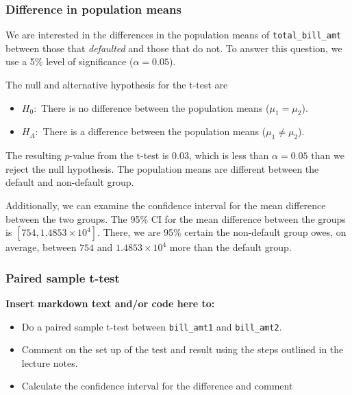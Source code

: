 \documentclass[
]{article}
\providecommand{\tightlist}{%
  \setlength{\itemsep}{0pt}\setlength{\parskip}{0pt}}
\begin{document}
\hypertarget{difference-in-population-means}{%
\subsubsection{Difference in population
means}\label{difference-in-population-means}}

We are interested in the differences in the population means of
\texttt{total\_bill\_amt} between those that \emph{defaulted} and those
that do not. To answer this question, we use a 5\% level of significance
(\(\alpha = 0.05\)).

The null and alternative hypothesis for the t-test are

\begin{itemize}
\tightlist
\item
  \(H_0:\) There is no difference between the population means
  (\(\mu_1 = \mu_2\)).
\item
  \(H_A:\) There is a difference between the population means
  (\(\mu_1 \ne \mu_2\)).
\end{itemize}

The resulting \(p\)-value from the t-test is \(0.03\), which is less
than \(\alpha = 0.05\) than we reject the null hypothesis. The
population means are different between the default and non-default
group.

Additionally, we can examine the confidence interval for the mean
difference between the two groups. The 95\% CI for the mean difference
between the groups is \([754, \ensuremath{1.4853\times 10^{4}}]\).
There, we are 95\% certain the non-default group owes, on average,
between \(754\) and \(\ensuremath{1.4853\times 10^{4}}\) more than the
default group.

\hypertarget{paired-sample-t-test}{%
\subsubsection{Paired sample t-test}\label{paired-sample-t-test}}

\textbf{Insert markdown text and/or code here to:}

\begin{itemize}
\tightlist
\item
  Do a paired sample t-test between \texttt{bill\_amt1} and
  \texttt{bill\_amt2}.
\item
  Comment on the set up of the test and result using the steps outlined
  in the lecture notes.
\item
  Calculate the confidence interval for the difference and comment
\end{itemize}
\end{document}

